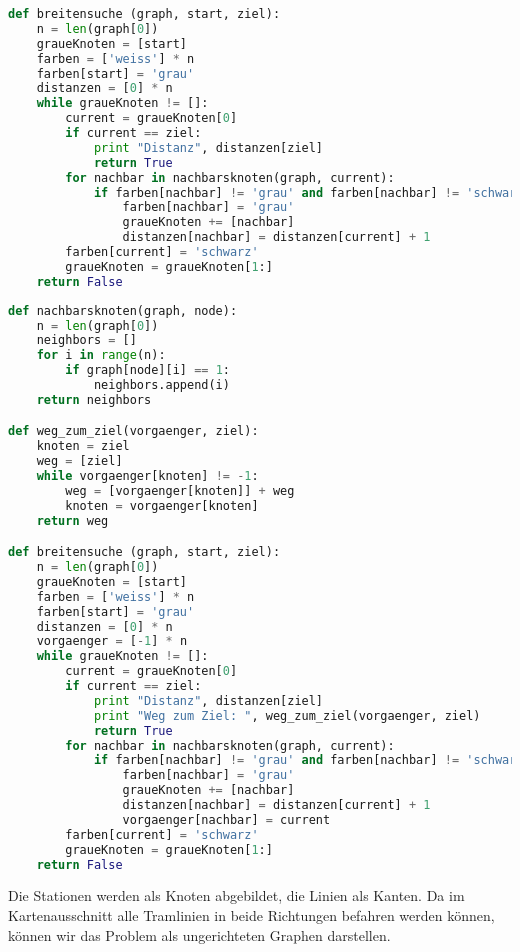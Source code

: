 \begin{lsg}
\hfill
\begin{lstlisting}[language=Python,basicstyle=\small,tabsize=3]
def breitensuche (graph, start, ziel):
	n = len(graph[0])
	graueKnoten = [start]
	farben = ['weiss'] * n
	farben[start] = 'grau'
	distanzen = [0] * n
	while graueKnoten != []:
		current = graueKnoten[0]
		if current == ziel:
			print "Distanz", distanzen[ziel]
			return True
		for nachbar in nachbarsknoten(graph, current):
			if farben[nachbar] != 'grau' and farben[nachbar] != 'schwarz':
				farben[nachbar] = 'grau'
				graueKnoten += [nachbar]
				distanzen[nachbar] = distanzen[current] + 1
		farben[current] = 'schwarz'
		graueKnoten = graueKnoten[1:]
	return False
\end{lstlisting}
\end{lsg}

\begin{lsg}
\hfill
\begin{lstlisting}[language=Python,basicstyle=\small,tabsize=3]
def nachbarsknoten(graph, node):
	n = len(graph[0])
	neighbors = []
	for i in range(n):
		if graph[node][i] == 1:
			neighbors.append(i)
	return neighbors

def weg_zum_ziel(vorgaenger, ziel):
	knoten = ziel
	weg = [ziel]	
	while vorgaenger[knoten] != -1:
		weg = [vorgaenger[knoten]] + weg
		knoten = vorgaenger[knoten]
	return weg

def breitensuche (graph, start, ziel):
	n = len(graph[0])
	graueKnoten = [start]
	farben = ['weiss'] * n
	farben[start] = 'grau'
	distanzen = [0] * n
	vorgaenger = [-1] * n
	while graueKnoten != []:
		current = graueKnoten[0]
		if current == ziel:
			print "Distanz", distanzen[ziel]
			print "Weg zum Ziel: ", weg_zum_ziel(vorgaenger, ziel)
			return True
		for nachbar in nachbarsknoten(graph, current):
			if farben[nachbar] != 'grau' and farben[nachbar] != 'schwarz':
				farben[nachbar] = 'grau'
				graueKnoten += [nachbar]
				distanzen[nachbar] = distanzen[current] + 1
				vorgaenger[nachbar] = current
		farben[current] = 'schwarz'
		graueKnoten = graueKnoten[1:]
	return False
\end{lstlisting}
\end{lsg}

\begin{lsg}
Die Stationen werden als Knoten abgebildet, die Linien als Kanten. Da im Kartenausschnitt alle Tramlinien in beide Richtungen befahren werden k\"onnen, k\"onnen wir das Problem als ungerichteten Graphen darstellen.
\end{lsg}

